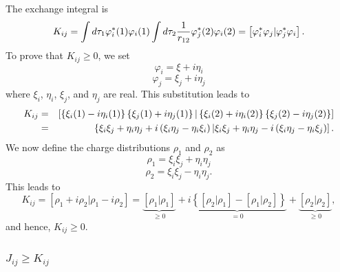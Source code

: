 The exchange integral is
\begin{equation}
K_{ij} = \int d \tau_1 \varphi^*_i (1) \varphi_i(1) \int d \tau_2 {1 \over 
r_{12}} \varphi^*_j (2) \varphi_i(2) = \left[ \varphi^*_i \varphi_j \vert 
\varphi^*_j \varphi_i \right].
\end{equation}
To prove that $K_{ij} \geq 0$, we set
\begin{equation}
\varphi_i = \xi + i \eta_i
\end{equation}
\begin{equation}
\varphi_j = \xi_j + i \eta_j
\end{equation}
where $\xi_i$, $\eta_i$, $\xi_j$, and $\eta_j$ are real. This substitution 
leads to
\begin{eqnarray*}
K_{ij} &=& \left[ \left\{ \xi_i(1) - i \eta_i(1) \right\} \left\{ 
\xi_j(1) + i \eta_j(1) \right\} \vert \left\{ \xi_i(2) + i \eta_i(2) 
\right\} \left\{ \xi_j(2) - i \eta_j(2) \right\} \right]\cr
&=& \left\{ \xi_i \xi_j + \eta_i \eta_j + i \left( \xi_i \eta_j - 
\eta_i \xi_i \right) \vert \xi_i \xi_j + \eta_i \eta_j - i \left( 
\xi_i \eta_j - \eta_i \xi_j \right) \right].\cr
\end{eqnarray*}
We now define the charge distributions $\rho_1$ and $\rho_2$ as
\begin{equation}
\rho_1 = \xi_i \xi_j + \eta_i \eta_j
\end{equation}
\begin{equation}
\rho_2 = \xi_i \xi_j - \eta_i \eta_j .
\end{equation}
This leads to
\begin{equation}
K_{ij} = \left[ \rho_1 + i \rho_2 \vert \rho_1 - i \rho_2 \right] = 
\underbrace{\left[ \rho_1 \vert \rho_1 \right]}_{\geq 0} + 
\underbrace{i \left\{ \left[ \rho_2 \vert \rho_1 \right] - \left[ 
\rho_1 \vert \rho_2 \right] \right\}}_{=0} + 
\underbrace{\left[ \rho_2 \vert \rho_2 \right]}_{\geq 0} ,
\end{equation}
and hence, $K_{ij} \geq 0$.

\subsubsection{$J_{ij} \geq K_{ij}$}
  
